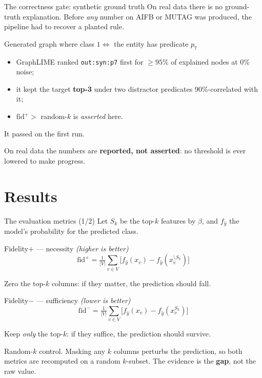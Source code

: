 \documentclass[10pt,aspectratio=169]{beamer}
\begin{document}
\begin{frame}{The correctness gate: synthetic ground truth}
  On real data there is no ground-truth explanation. Before \emph{any} number
  on AIFB or MUTAG was produced, the pipeline had to recover a planted rule.

  \vfill
  \begin{block}{Generated graph where class $1 \Longleftrightarrow$ the entity has predicate $p_7$}
    \begin{itemize}
      \item GraphLIME ranked \texttt{out:syn:p7} \alert{first} for
        $\ge 95\%$ of explained nodes at $0\%$ noise;
      \item it kept the target \textbf{top-3} under two distractor
        predicates $90\%$-correlated with it;
      \item $\mathrm{fid}^+ >$ random-$k$ is \emph{asserted} here.
    \end{itemize}
    It passed on the first run.
  \end{block}

  \vfill
  On real data the numbers are \textbf{reported, not asserted}: no threshold
  is ever lowered to make progress.
\end{frame}

\section{Results}

\begin{frame}{The evaluation metrics (1/2)}
  Let $S_k$ be the top-$k$ features by $\beta$, and $f_{\hat y}$ the model's
  probability for the predicted class.

  \vfill
  \begin{block}{Fidelity$+$ --- necessity \quad \emph{(higher is better)}}
    \vspace{-1.5ex}
    \[
      \mathrm{fid}^+ = \tfrac{1}{|V|}\sum_{v\in V}
      \big[ f_{\hat y}(x_v) - f_{\hat y}(x_v^{\setminus S_k}) \big]
    \]
    \vspace{-2ex}

    Zero the top-$k$ columns: if they matter, the prediction should fall.
  \end{block}

  \begin{block}{Fidelity$-$ --- sufficiency \quad \emph{(lower is better)}}
    \vspace{-1.5ex}
    \[
      \mathrm{fid}^- = \tfrac{1}{|V|}\sum_{v\in V}
      \big[ f_{\hat y}(x_v) - f_{\hat y}(x_v^{S_k}) \big]
    \]
    \vspace{-2ex}

    Keep \emph{only} the top-$k$: if they suffice, the prediction should survive.
  \end{block}

  \vfill
  \alert{Random-$k$ control.} Masking any $k$ columns perturbs the
  prediction, so both metrics are recomputed on a random $k$-subset. The
  evidence is the \textbf{gap}, not the raw value.
\end{frame}
\end{document}

